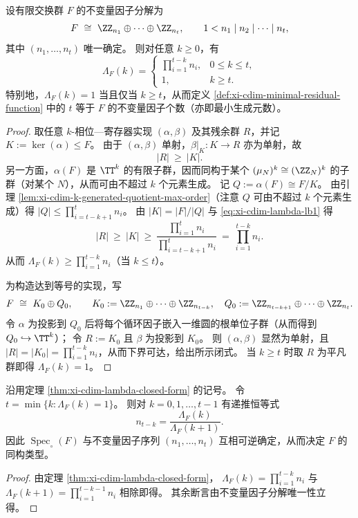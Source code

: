 \begin{theorem}\label{thm:xi-cdim-lambda-closed-form}
设有限交换群 \(F\) 的不变量因子分解为
\[
F\ \cong\ \ZZ_{n_1}\oplus\cdots\oplus\ZZ_{n_t},
\qquad
1<n_1\mid n_2\mid\cdots\mid n_t,
\]
其中 \((n_1,\dots,n_t)\) 唯一确定。
则对任意 \(k\ge 0\)，有
\[
\Lambda_F(k)=
\begin{cases}
\displaystyle \prod_{i=1}^{t-k} n_i,& 0\le k\le t,\\[6pt]
1,& k\ge t.
\end{cases}
\]
特别地，\(\Lambda_F(k)=1\) 当且仅当 \(k\ge t\)，从而定义 \ref{def:xi-cdim-minimal-residual-function} 中的 \(t\) 等于 \(F\) 的不变量因子个数（亦即最小生成元数）。
\end{theorem}
\begin{proof}
取任意 \(k\)-相位—寄存器实现 \((\alpha,\beta)\) 及其残余群 \(R\)，并记
\(
K:=\ker(\alpha)\le F
\)。
由于 \((\alpha,\beta)\) 单射，\(\beta|_{K}:K\to R\) 亦为单射，故
\begin{equation}\label{eq:xi-cdim-lambda-lb1}
|R|\ \ge\ |K|.
\end{equation}
另一方面，\(\alpha(F)\) 是 \(\TT^{k}\) 的有限子群，因而同构于某个 \((\mu_N)^k\cong(\ZZ_{N})^{k}\) 的子群（对某个 \(N\)），从而可由不超过 \(k\) 个元素生成。
记 \(Q:=\alpha(F)\cong F/K\)。
由引理 \ref{lem:xi-cdim-k-generated-quotient-max-order}（注意 \(Q\) 可由不超过 \(k\) 个元素生成）得
\(
|Q|\le \prod_{i=t-k+1}^{t}n_i
\)。
由 \(|K|=|F|/|Q|\) 与 \eqref{eq:xi-cdim-lambda-lb1} 得
\[
|R|\ \ge\ |K|
\ \ge\
\frac{\prod_{i=1}^{t}n_i}{\prod_{i=t-k+1}^{t}n_i}
\ =\
\prod_{i=1}^{t-k}n_i.
\]
从而 \(\Lambda_F(k)\ge \prod_{i=1}^{t-k}n_i\)（当 \(k\le t\)）。
\par
为构造达到等号的实现，写
\[
F\ \cong\ K_0\oplus Q_0,\qquad
K_0:=\ZZ_{n_1}\oplus\cdots\oplus\ZZ_{n_{t-k}},\quad
Q_0:=\ZZ_{n_{t-k+1}}\oplus\cdots\oplus\ZZ_{n_t}.
\]
令 \(\alpha\) 为投影到 \(Q_0\) 后将每个循环因子嵌入一维圆的根单位子群（从而得到 \(Q_0\hookrightarrow \TT^{k}\)）；
令 \(R:=K_0\) 且 \(\beta\) 为投影到 \(K_0\)。
则 \((\alpha,\beta)\) 显然为单射，且 \(|R|=|K_0|=\prod_{i=1}^{t-k}n_i\)，从而下界可达，给出所示闭式。
当 \(k\ge t\) 时取 \(R\) 为平凡群即得 \(\Lambda_F(k)=1\)。
\end{proof}

\begin{corollary}\label{cor:xi-cdim-spectrum-completeness}
沿用定理 \ref{thm:xi-cdim-lambda-closed-form} 的记号。
令 \(t=\min\{k:\Lambda_F(k)=1\}\)。
则对 \(k=0,1,\dots,t-1\) 有递推恒等式
\[
n_{t-k}=\frac{\Lambda_F(k)}{\Lambda_F(k+1)}.
\]
因此 \(\operatorname{Spec}_{\circ}(F)\) 与不变量因子序列 \((n_1,\dots,n_t)\) 互相可逆确定，从而决定 \(F\) 的同构类型。
\end{corollary}
\begin{proof}
由定理 \ref{thm:xi-cdim-lambda-closed-form}，
\(
\Lambda_F(k)=\prod_{i=1}^{t-k}n_i
\)
与
\(
\Lambda_F(k+1)=\prod_{i=1}^{t-k-1}n_i
\)
相除即得。
其余断言由不变量因子分解唯一性立得。
\end{proof}

